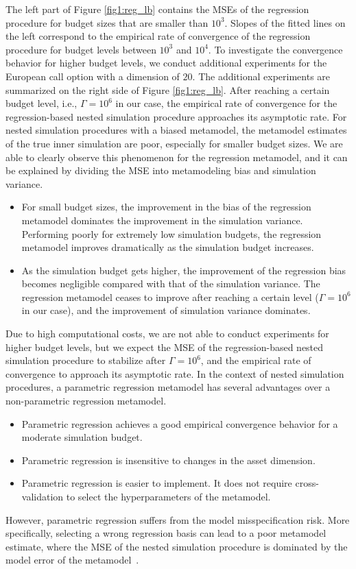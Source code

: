 The left part of Figure \ref{fig1:reg_lb} contains the MSEs of the regression procedure for budget sizes that are smaller than $10^3$. 
Slopes of the fitted lines on the left correspond to the empirical rate of convergence of the regression procedure for budget levels between $10^3$ and $10^4$.
To investigate the convergence behavior for higher budget levels, we conduct additional experiments for the European call option with a dimension of $20$. 
The additional experiments are summarized on the right side of Figure \ref{fig1:reg_lb}.
After reaching a certain budget level, i.e., $\Gamma = 10^6$ in our case, the empirical rate of convergence for the regression-based nested simulation procedure approaches its asymptotic rate. 
For nested simulation procedures with a biased metamodel, the metamodel estimates of the true inner simulation are poor, especially for smaller budget sizes. 
We are able to clearly observe this phenomenon for the regression metamodel, and it can be explained by dividing the MSE into metamodeling bias and simulation variance.
\begin{itemize}
    \item For small budget sizes, the improvement in the bias of the regression metamodel dominates the improvement in the simulation variance. 
    Performing poorly for extremely low simulation budgets, the regression metamodel improves dramatically as the simulation budget increases.
    \item As the simulation budget gets higher, the improvement of the regression bias becomes negligible compared with that of the simulation variance. 
    The regression metamodel ceases to improve after reaching a certain level ($\Gamma = 10^6$ in our case), and the improvement of simulation variance dominates.
\end{itemize}
Due to high computational costs, we are not able to conduct experiments for higher budget levels, but we expect the MSE of the regression-based nested simulation procedure to stabilize after $\Gamma = 10^6$, and the empirical rate of convergence to approach its asymptotic rate.
In the context of nested simulation procedures, a parametric regression metamodel has several advantages over a non-parametric regression metamodel.
\begin{itemize}
    \item Parametric regression achieves a good empirical convergence behavior for a moderate simulation budget.
    \item Parametric regression is insensitive to changes in the asset dimension.
    \item Parametric regression is easier to implement.
    It does not require cross-validation to select the hyperparameters of the metamodel.
\end{itemize}
However, parametric regression suffers from the model misspecification risk.
More specifically, selecting a wrong regression basis can lead to a poor metamodel estimate, where the MSE of the nested simulation procedure is dominated by the model error of the metamodel~\citep{broadie2015risk}.


